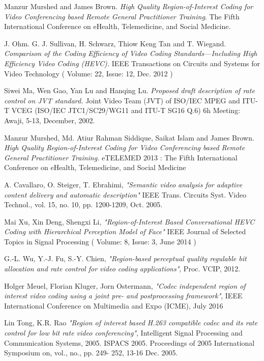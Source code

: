\documentclass[11pt]{article} %
\begin{document}
\begin{thebibliography}{9}
Manzur Murshed and James Brown. 
\textit{High Quality Region-of-Interest Coding for Video Conferencing based Remote General Practitioner Training}. 
The Fifth International Conference on eHealth, Telemedicine, and Social Medicine.

J. Ohm. G. J. Sullivan, H. Schwarz, Thiow Keng Tan and T. Wiegand.
\textit{Comparison of the Coding Efficiency of Video Coding Standards—Including High Efficiency Video Coding (HEVC).}
 IEEE Transactions on Circuits and Systems for Video Technology ( Volume: 22, Issue: 12, Dec. 2012 )

Siwei Ma, Wen Gao, Yan Lu and Hanqing Lu.
\textit{Proposed draft description of rate control on JVT standard. }
Joint Video Team (JVT) of ISO/IEC MPEG and ITU-T VCEG (ISO/IEC JTC1/SC29/WG11 and ITU-T SG16 Q.6) 6h Meeting: Awaji, 5-13, December, 2002.

Manzur Murshed, Md. Atiur Rahman Siddique, Saikat Islam and James Brown.
\textit{High Quality Region-of-Interest Coding for Video Conferencing based Remote General Practitioner Training.}
eTELEMED 2013 : The Fifth International Conference on eHealth, Telemedicine, and Social Medicine

A. Cavallaro, O. Steiger, T. Ebrahimi, \textit{"Semantic video analysis for adaptive content delivery and automatic description"}
IEEE Trans. Circuits Syst. Video Technol., vol. 15, no. 10, pp. 1200-1209, Oct. 2005.

Mai Xu, Xin Deng, Shengxi Li, \textit{"Region-of-Interest Based Conversational HEVC Coding with Hierarchical Perception Model of Face"}
IEEE Journal of Selected Topics in Signal Processing ( Volume: 8, Issue: 3, June 2014 )

G.-L. Wu, Y.-J. Fu, S.-Y. Chien, \textit{"Region-based perceptual quality regulable bit allocation and rate control for video coding applications"},
Proc. VCIP, 2012.

Holger Meuel, Florian Kluger, Jorn Ostermann, \textit{"Codec independent region of interest video coding using a joint pre- and postprocessing framework"}, 
IEEE International Conference on Multimedia and Expo (ICME), July 2016

Lin Tong, K.R. Rao \textit{"Region of interest based H.263 compatible codec and its rate control for low bit rate video conferencing"}, 
Intelligent Signal Processing and Communication Systems, 2005. ISPACS 2005. Proceedings of 2005 International Symposium on, vol., no., pp. 249- 252, 13-16 Dec. 2005.


\end{thebibliography}
\end{document}
